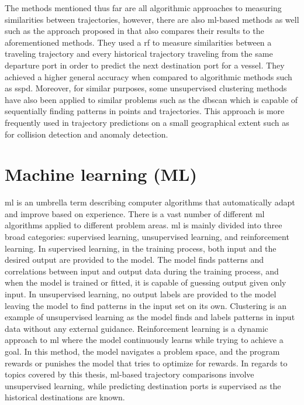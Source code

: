 The methods mentioned thus far are all algorithmic approaches to measuring similarities between trajectories, however, there are also \acrshort{ml}-based methods as well such as the approach proposed in \cite{Zhang2020AISApproach} that also compares their results to the aforementioned methods. They used a \acrfull{rf} to measure similarities between a traveling trajectory and every historical trajectory traveling from the same departure port in order to predict the next destination port for a vessel. They achieved a higher general accuracy when compared to algorithmic methods such as \acrshort{sspd}. Moreover, for similar purposes, some unsupervised clustering methods have also been applied to similar problems such as the \acrfull{dbscan} which is capable of sequentially finding patterns in points and trajectories. This approach is more frequently used in trajectory predictions on a small geographical extent such as for collision detection and anomaly detection.

\section{Machine learning (ML)}

\acrfull{ml} is an umbrella term describing computer algorithms that automatically adapt and improve based on experience. There is a vast number of different \acrshort{ml} algorithms applied to different problem areas. \acrshort{ml} is mainly divided into three broad categories: supervised learning, unsupervised learning, and reinforcement learning. In supervised learning, in the training process, both input and the desired output are provided to the model. The model finds patterns and correlations between input and output data during the training process, and when the model is trained or fitted, it is capable of guessing output given only input. In unsupervised learning, no output labels are provided to the model leaving the model to find patterns in the input set on its own. Clustering is an example of unsupervised learning as the model finds and labels patterns in input data without any external guidance. Reinforcement learning is a dynamic approach to \acrshort{ml} where the model continuously learns while trying to achieve a goal. In this method, the model navigates a problem space, and the program rewards or punishes the model that tries to optimize for rewards. In regards to topics covered by this thesis, \acrshort{ml}-based trajectory comparisons involve unsupervised learning, while predicting destination ports is supervised as the historical destinations are known.

